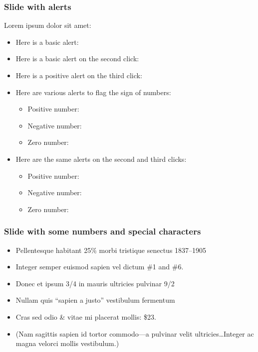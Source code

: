 \begin{frame}
\frametitle{Slide with alerts}
Lorem ipsum dolor sit amet:
\begin{itemize}
\item Here is a basic alert: 
\item Here is a basic alert on the second click: 
\item Here is a positive alert on the third click: 
\item Here are various alerts to flag the sign of numbers:
\begin{itemize}
\item Positive number: 
\item Negative number: 
\item Zero number: 
\end{itemize}
\item Here are the same alerts on the second and third clicks:
\begin{itemize}
\item Positive number: 
\item Negative number: 
\item Zero number: 
\end{itemize}
\end{itemize}
\end{frame}

\begin{frame}
\end{frame}

\begin{frame}
\frametitle{Slide with some numbers and special characters} 
\begin{itemize}
\item Pellentesque habitant 25\% morbi tristique senectus 1837--1905
\item Integer semper euismod sapien vel dictum \#1 and \#6.
\item  Donec et ipsum 3/4 in mauris ultricies pulvinar 9/2
\item Nullam quis ``sapien a justo'' vestibulum fermentum
\item Cras sed odio \& vitae mi placerat mollis: \$23.
\item (Nam sagittis sapien id tortor commodo---a pulvinar velit ultricies\ldots Integer ac magna velorci mollis vestibulum.)
\end{itemize}	
\end{frame}


